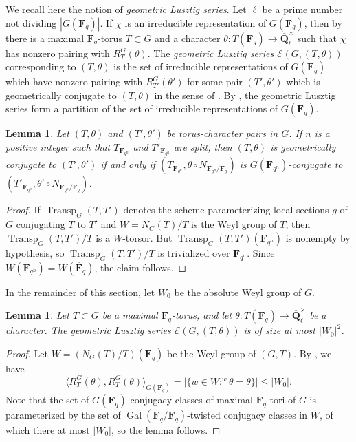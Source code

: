 \documentclass[11pt,reqno]{amsart}
\newtheorem{lemma}[theorem]{Lemma}
\theoremstyle{definition}
\newcommand{\F}{{\mathbf F}}
\newcommand{\Q}{{\mathbf Q}}
\newcommand{\cE}{\mathcal{E}}
\DeclareMathOperator{\Gal}{Gal}
\DeclareMathOperator{\Transp}{Transp}
\newcommand{\ol}[1]{\overline{#1}}
\newcommand{\co}[1]{\colon}
\begin{document}
We recall here the notion of \emph{geometric Lusztig series}. Let $\ell$ be a prime number not dividing $|G(\F_q)|$. If $\chi$ is an irreducible representation of $G(\F_q)$, then by \cite[Corollary 7.7]{DL76} there is a maximal $\F_q$-torus $T \subset G$ and a character $\theta\colon T(\F_q) \to \ol\Q_\ell^\times$ such that $\chi$ has nonzero pairing with $R_T^G(\theta)$. The \emph{geometric Lusztig series} $\cE(G, (T, \theta))$ corresponding to $(T, \theta)$ is the set of irreducible representations of $G(\F_q)$ which have nonzero pairing with $R_{T'}^G(\theta')$ for some pair $(T',\theta')$ which is geometrically conjugate to $(T,\theta)$ in the sense of \cite[Definition 5.5]{DL76}. By \cite[Corollary 6.3]{DL76}, the geometric Lusztig series form a partition of the set of irreducible representations of $G(\F_q)$.

\begin{lemma}\label{lemma:geometric-conjugacy-split}
    Let $(T, \theta)$ and $(T', \theta')$ be torus-character pairs in $G$. If $n$ is a positive integer such that $T_{\F_{q^n}}$ and $T'_{\F_{q^n}}$ are split, then $(T, \theta)$ is geometrically conjugate to $(T', \theta')$ if and only if $(T_{\F_{q^n}}, \theta \circ N_{\F_{q^n}/\F_q})$ is $G(\F_{q^n})$-conjugate to $(T'_{\F_{q^n}}, \theta' \circ N_{\F_{q^n}/\F_q})$.
\end{lemma}

\begin{proof}
    If $\Transp_G(T, T')$ denotes the scheme parameterizing local sections $g$ of $G$ conjugating $T$ to $T'$ and $W = N_G(T)/T$ is the Weyl group of $T$, then $\Transp_G(T, T')/T$ is a $W$-torsor. But $\Transp_G(T, T')(\F_{q^n})$ is nonempty by hypothesis, so $\Transp_G(T, T')/T$ is trivialized over $\F_{q^n}$. Since $W(\F_{q^n}) = W(\ol\F_q)$, the claim follows.
\end{proof}

In the remainder of this section, let $W_0$ be the absolute Weyl group of $G$.

\begin{lemma}\label{lemma:lusztig-series-size-bound}
    Let $T \subset G$ be a maximal $\F_q$-torus, and let $\theta\colon T(\F_q) \to \ol\Q_\ell^\times$ be a character. The geometric Lusztig series $\cE(G, (T, \theta))$ is of size at most $|W_0|^2$.
\end{lemma}

\begin{proof}
    Let $W = (N_{G}(T)/T)(\F_q)$ be the Weyl group of $(G, T)$. By \cite[Theorem 6.8]{DL76}, we have
    \[
    \langle R_{T}^{G}(\theta), R_{T}^{G}(\theta)\rangle_{G(\F_q)} = |\{w \in W\co {}^w\theta = \theta\}| \leq |W_0|.
    \]
    Note that the set of $G(\F_q)$-conjugacy classes of maximal $\F_q$-tori of $G$ is parameterized by the set of $\Gal(\ol\F_q/\F_q)$-twisted conjugacy classes in $W$, of which there at most $|W_0|$, so the lemma follows.
\end{proof}
\end{document}
